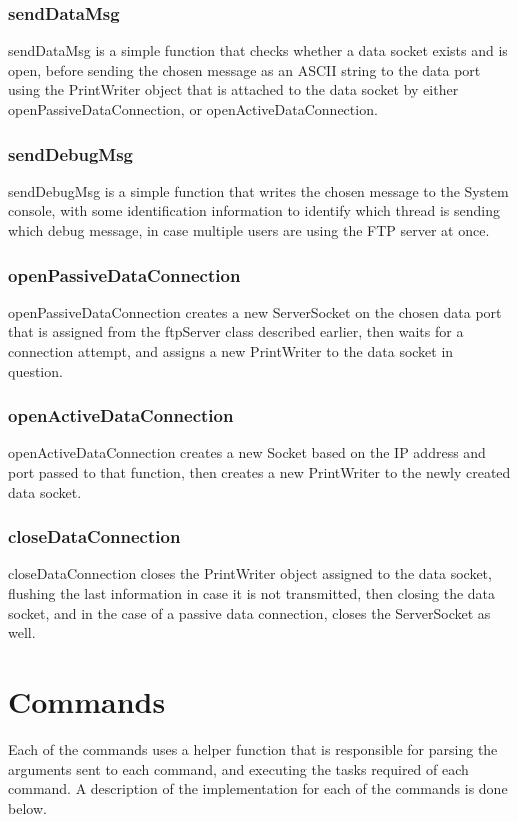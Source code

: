 \documentclass[11pt,a4paper,titlepage]{article}
\begin{document}
\subsubsection{sendDataMsg}
sendDataMsg is a simple function that checks whether a data socket exists and is open, before sending the chosen message as an ASCII string to the data port using the PrintWriter object that is attached to the data socket by either openPassiveDataConnection, or openActiveDataConnection.

\subsubsection{sendDebugMsg}
sendDebugMsg is a simple function that writes the chosen message to the System console, with some identification information to identify which thread is sending which debug message, in case multiple users are using the FTP server at once.

\subsubsection{openPassiveDataConnection}
openPassiveDataConnection creates a new ServerSocket on the chosen data port that is assigned from the ftpServer class described earlier, then waits for a connection attempt, and assigns a new PrintWriter to the data socket in question.

\subsubsection{openActiveDataConnection}
openActiveDataConnection creates a new Socket based on the IP address and port passed to that function, then creates a new PrintWriter to the newly created data socket.

\subsubsection{closeDataConnection}
closeDataConnection closes the PrintWriter object assigned to the data socket, flushing the last information in case it is not transmitted, then closing the data socket, and in the case of a passive data connection, closes the ServerSocket as well.

\section{Commands}
Each of the commands uses a helper function that is responsible for parsing the arguments sent to each command, and executing the tasks required of each command. A description of the implementation for each of the commands is done below.
\end{document}
